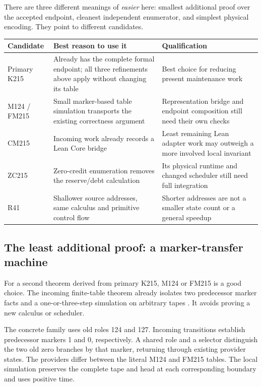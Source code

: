 \documentclass[11pt]{article}
\theoremstyle{remark}
\begin{document}
There are three different meanings of \emph{easier} here: smallest additional
proof over the accepted endpoint, cleanest independent enumerator, and
simplest physical encoding. They point to different candidates.

\begin{center}
\small
\begin{tabular}{p{24mm}p{52mm}p{62mm}}
\toprule
Candidate & Best reason to use it & Qualification\\
\midrule
Primary K215 &
Already has the complete formal endpoint; all three refinements above
apply without changing its table &
Best choice for reducing present maintenance work\\
\addlinespace
M124 / FM215 &
Small marker-based table simulation transports the existing correctness
argument &
Representation bridge and endpoint composition still need their own checks\\
\addlinespace
CM215 &
Incoming work already records a Lean Core bridge &
Least remaining Lean adapter work may outweigh a more involved local invariant\\
\addlinespace
ZC215 &
Zero-credit enumeration removes the reserve/debt calculation &
Its physical runtime and changed scheduler still need full integration\\
\addlinespace
R41 &
Shallower source addresses, same calculus and primitive control flow &
Shorter addresses are not a smaller state count or a general speedup\\
\bottomrule
\end{tabular}
\end{center}

\subsection{The least additional proof: a marker-transfer machine}

For a second theorem derived from primary K215, M124 or FM215 is a good
choice. The incoming finite-table theorem already isolates two predecessor
marker facts and a one-or-three-step simulation on arbitrary tapes
\cite{refinements}. It avoids proving a new calculus or scheduler.

The concrete family uses old roles 124 and 127. Incoming transitions
establish predecessor markers 1 and 0, respectively. A shared role and a
selector distinguish the two old zero branches by that marker, returning
through existing provider states. The providers differ between the
literal M124 and FM215 tables. The local simulation preserves the complete
tape and head at each corresponding boundary and uses positive time.
\end{document}
